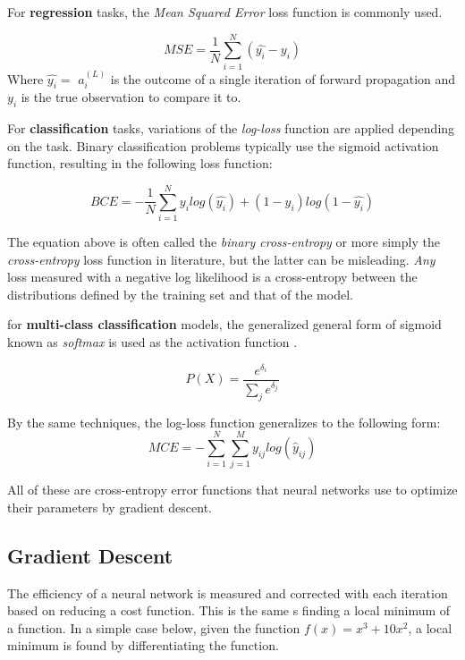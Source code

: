 For \textbf{regression} tasks, the \textit{Mean Squared Error} loss function is commonly used.

\[
MSE = \frac{1}{N} \sum_{i=1}^N (\hat{y_i} - y_i)
\] Where $\hat{y_i} =$ \(a^{(L)}_i\) is the outcome of a single iteration of forward
propagation and \(y_i\) is the true observation to compare it to.

For \textbf{classification} tasks, variations of the \textit{log-loss} function are applied depending on the task.  Binary classification problems typically use the sigmoid activation function, resulting in the following loss function:


$$
BCE = - \frac{1}{N} \sum_{i=1}^N y_i log (\hat{y_i}) + (1-y_i) log(1-\hat{y_i})
$$

The equation above is often called the \textit{binary cross-entropy} or more simply the \textit{cross-entropy} loss function in literature, but the latter can be misleading.  \textit{Any} loss measured with a negative log likelihood is a cross-entropy between the distributions defined by the training set and that of the model. \cite{Goodfellow-et-al-2016}

for \textbf{multi-class classification} models, the generalized general form of sigmoid known as \textit{softmax} is used as the activation function \cite{bishop2006pattern}.  

$$
P(X) = \frac{e^{\delta_i}}{\sum_j{e^{\delta_j} }}
$$

By the same techniques, the log-loss function generalizes to the following form:
$$
MCE = -\sum_{i=1}^N \sum_{j=1}^M y_{ij} log (\hat{y}_{ij})
$$

All of these are cross-entropy error functions that neural networks use to optimize their parameters by gradient descent.



\hypertarget{gradient-descent}{%
\subsection{Gradient Descent}\label{gradient-descent}}

The efficiency of a neural network is measured and corrected with each
iteration based on reducing a cost function. This is the same s finding
a local minimum of a function. In a simple case below, given the
function \(f(x) = x^3 + 10x^2\), a local minimum is found by
differentiating the function.

